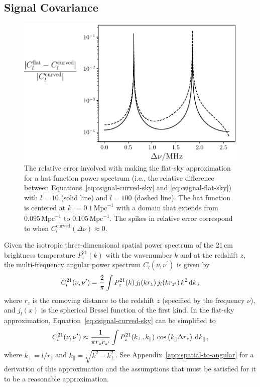 \begin{bibunit}
\subsection{Signal Covariance}\label{sec:signal-covariance}

\begin{figure}[t]
    \centering
    \includegraphics[width=\columnwidth]{figures/chapter4/flat-sky-approximation}
    \caption{
        The relative error involved with making the flat-sky approximation for a hat function power
        spectrum (i.e., the relative difference between Equations~\ref{eq:csignal-curved-sky} and
        \ref{eq:csignal-flat-sky}) with $l=10$ (solid line) and $l=100$ (dashed line). The hat
        function is centered at $k_\parallel=0.1\,\text{Mpc}^{-1}$ with a domain that extends from
        $0.095\,\text{Mpc}^{-1}$ to $0.105\,\text{Mpc}^{-1}$. The spikes in relative error
        correspond to when $C_l^\text{curved}(\Delta\nu) \approx 0$.
    }
    \label{fig:flat-sky-approximation}
\end{figure}

Given the isotropic three-dimensional spatial power spectrum of the 21\,cm brightness temperature
$P^{21}_z(k)$ with the wavenumber $k$ and at the redshift $z$, the multi-frequency angular
power spectrum $C_l(\nu, \nu^\prime)$ is given by
\begin{equation}\label{eq:csignal-curved-sky}
    C^{21}_l(\nu, \nu^\prime) =
        \frac{2}{\pi}
        \int
        P_z^{21}(k) \,
        j_l(k r_z) \,
        j_l(k r_{z^\prime}) \,
        k^2 \, {\textrm d} k\,,
\end{equation}
where $r_z$ is the comoving distance to the redshift $z$ (specified by the frequency $\nu$), and
$j_l(x)$ is the spherical Bessel function of the first kind. In the flat-sky approximation,
Equation~\ref{eq:csignal-curved-sky} can be simplified to
\begin{equation}\label{eq:csignal-flat-sky}
    C^{21}_l(\nu, \nu^\prime) \approx
        \frac{1}{\pi r_z r_{z^\prime}}
        \int
        P_z^{21}(k_\perp, k_\parallel) \,
        \cos\left(k_\parallel \Delta r_z\right)
        \, {\textrm d} k_\parallel\,,
\end{equation}
where $k_\perp = l/r_z$ and $k_\parallel = \sqrt{k^2-k_\perp^2}$.  See
Appendix~\ref{app:spatial-to-angular} for a derivation of this approximation and the assumptions
that must be satisfied for it to be a reasonable approximation.


\end{bibunit}
